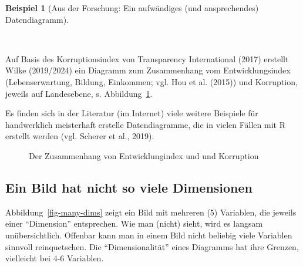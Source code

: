 \documentclass[
  letterpaper,
]{scrbook}
\theoremstyle{definition}
\theoremstyle{definition}
\newtheorem{example}{Beispiel}[chapter]
\theoremstyle{definition}
\theoremstyle{remark}
\begin{document}
\begin{example}[Aus der Forschung: Ein aufwändiges (und ansprechendes)
Datendiagramm]\protect\hypertarget{exm-datendiagramm}{}\label{exm-datendiagramm}

~

Auf Basis des Korruptionsindex von Transparency International (2017)
erstellt Wilke (2019/2024) ein Diagramm zum Zusammenhang vom
Entwicklungsindex (Lebenserwartung, Bildung, Einkommen; vgl. Hou et al.
(2015)) und Korruption, jeweils auf Landesebene, s.
Abbildung~\ref{fig-develop-corrupt}.

Es finden sich in der Literatur (im Internet) viele weitere Beispiele
für handwerklich meisterhaft erstelle Datendiagramme, die in vielen
Fällen mit R erstellt werden (vgl. Scherer et al., 2019).

\begin{figure}


\caption{\label{fig-develop-corrupt}Der Zusammenhang von
Entwicklungindex und und Korruption}

\end{figure}%

\end{example}

\subsection{Ein Bild hat nicht so viele
Dimensionen}\label{ein-bild-hat-nicht-so-viele-dimensionen}

Abbildung~\ref{fig-many-dims} zeigt ein Bild mit mehreren (5) Variablen,
die jeweils einer \enquote{Dimension} entsprechen. Wie man (nicht)
sieht, wird es langsam unübersichtlich. Offenbar kann man in einem Bild
nicht beliebig viele Variablen sinnvoll reinquetschen. Die
\enquote{Dimensionalität} eines Diagramms hat ihre Grenzen, vielleicht
bei 4-6 Variablen.
\end{document}

